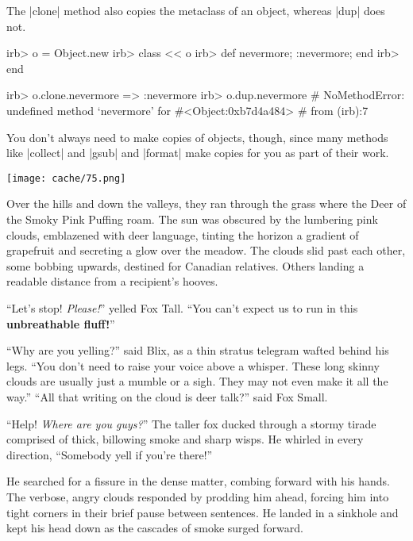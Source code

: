 \documentclass[12pt,twoside]{report}
\begin{document}
The \rubyinline|clone| method also copies the
metaclass of an object, whereas \rubyinline|dup| does
not.


\begin{consolecode}

 irb> o = Object.new
 irb> class << o
 irb>   def nevermore; :nevermore; end
 irb> end

 irb> o.clone.nevermore
   => :nevermore
 irb> o.dup.nevermore
 # NoMethodError: undefined method `nevermore' for #<Object:0xb7d4a484>
 #         from (irb):7

\end{consolecode}



You don't always need to make copies of objects, though, since many
methods like \rubyinline|collect| and
\rubyinline|gsub| and
\rubyinline|format| make copies for you as part of
their work.

	\texttt{[image: cache/75.png]}

Over the hills and down the valleys, they ran through the grass where
the Deer of the Smoky Pink Puffing roam.  The sun was obscured by the
lumbering pink clouds, emblazened with deer language, tinting the
horizon a gradient of grapefruit and secreting a glow over the meadow.
The clouds slid past each other, some bobbing upwards, destined for
Canadian relatives.  Others landing a readable distance from a
recipient's hooves.

``Let's stop!  {\em Please!}'' yelled Fox Tall.  ``You can't expect us
to run in this {\bf unbreathable fluff!}''

``Why are you yelling?'' said Blix, as a thin stratus telegram wafted
behind his legs.  ``You don't need to raise your voice above a
whisper.  These long skinny clouds are usually just a mumble or a
sigh.  They may not even make it all the way.''  ``All that writing on
the cloud is deer talk?'' said Fox Small.

``Help!  {\em Where are you guys?}''  The taller fox ducked through a
stormy tirade comprised of thick, billowing smoke and sharp wisps.  He
whirled in every direction, ``Somebody yell if you're there!''

He searched for a fissure in the dense matter, combing forward with
his hands.  The verbose, angry clouds responded by prodding him ahead,
forcing him into tight corners in their brief pause between sentences.
He landed in a sinkhole and kept his head down as the cascades of
smoke surged forward.
\end{document}
